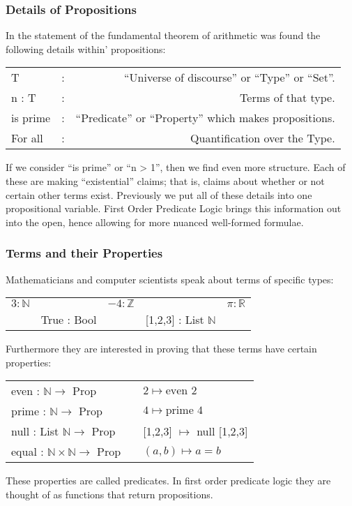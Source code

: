 \documentclass{beamer}
\theoremstyle{indentDefn} \newtheorem{defn}[]{Definition}
\begin{document}
\begin{frame}
	\frametitle{Details of Propositions}
	
	In the statement of the fundamental theorem of arithmetic was found the following details within' propositions: 

	\begin{tabular}{l c r}
		T & : & ``Universe of discourse'' or ``Type'' or ``Set''. \\
		n : T & : & Terms of that type. \\
		is prime & : & ``Predicate'' or ``Property'' which makes propositions. \\
		For all & : & Quantification over the Type. 
	\end{tabular}

	If we consider ``is prime'' or ``n > 1'', then we find even more structure. Each of these are making ``existential'' claims; that is, claims about whether or not certain other terms exist. Previously we put all of these details into one propositional variable. First Order Predicate Logic brings this information out into the open, hence allowing for more nuanced well-formed formulae. 

\end{frame}

\begin{frame}
\frametitle{Terms and their Properties}

	Mathematicians and computer scientists speak about terms of specific types:

	\begin{tabular}{c c c c c}
		$3 : \mathbb{N}$ & & $-4 : \mathbb{Z}$ & & $\pi : \mathbb{R}$  \\
		 & True : Bool & & [1,2,3] : List $\mathbb{N}$ & 	
	\end{tabular}

	Furthermore they are interested in proving that these terms have certain properties: 

	\begin{center}
		\begin{tabular}{l c l}
			even : $\mathbb{N} \to $ Prop & & $2 \mapsto \text{even } 2$ \\
			prime : $\mathbb{N} \to $ Prop & & $4 \mapsto \text{prime } 4$ \\
			null : List $\mathbb{N} \to $ Prop & & [1,2,3] $\mapsto$ null [1,2,3] \\
			equal : $\mathbb{N}\times\mathbb{N} \to $ Prop & & $(a,b) \mapsto a = b$
		\end{tabular}
	\end{center}

	These properties are called predicates. In first order predicate logic they are thought of as functions that return propositions. 

\end{frame}
\end{document}
